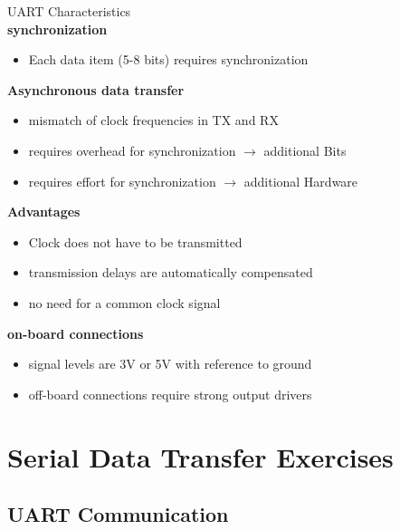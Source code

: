 \begin{concept}{UART Characteristics}
    \vspace{2mm}\\
    \textbf{synchronization}
    \begin{itemize}
        \item Each data item (5-8 bits) requires synchronization
    \end{itemize}
    \vspace{2mm}

    \textbf{Asynchronous data transfer}
    \begin{itemize}
        \item mismatch of clock frequencies in TX and RX
        \item requires overhead for synchronization $\rightarrow$ additional Bits
        \item requires effort for synchronization $\rightarrow$ additional Hardware
    \end{itemize}
    \vspace{2mm}

    \textbf{Advantages}
    \begin{itemize}
        \item Clock does not have to be transmitted
        \item transmission delays are automatically compensated
        \item no need for a common clock signal
    \end{itemize}
    \vspace{2mm}
    
    \textbf{on-board connections}
    \begin{itemize}
        \item signal levels are 3V or 5V with reference to ground
        \item off-board connections require strong output drivers
    \end{itemize}
\end{concept}

\section{Serial Data Transfer Exercises}

\subsection{UART Communication}

